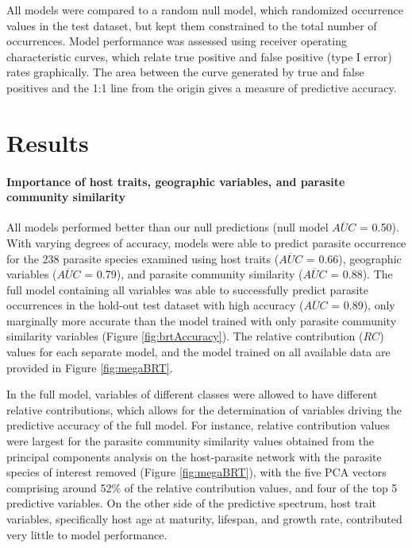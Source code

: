 \documentclass[12pt]{article}
\begin{document}
  All models were compared to a random null model, which randomized occurrence values in the test dataset, but kept them constrained to the total number of occurrences. Model performance was assessed using receiver operating characteristic curves, which relate true positive and false positive (type I error) rates graphically. The area between the curve generated by true and false positives and the 1:1 line from the origin gives a measure of predictive accuracy. 
  
   
\section*{Results}

  \paragraph{Importance of host traits, geographic variables, and parasite community similarity}
  All models performed better than our null predictions (null model $\overline{AUC}$ = 0.50). With varying degrees of accuracy, models were able to predict parasite occurrence for the 238 parasite species examined using host traits ($\overline{AUC}$ = 0.66), geographic variables ($\overline{AUC}$ = 0.79), and parasite community similarity ($\overline{AUC}$ = 0.88). The full model containing all variables was able to successfully predict parasite occurrences in the hold-out test dataset with high accuracy ($\overline{AUC}$ = 0.89), only marginally more accurate than the model trained with only parasite community similarity variables (Figure \ref{fig:brtAccuracy}). The relative contribution ($RC$) values for each separate model, and the model trained on all available data are provided in Figure \ref{fig:megaBRT}.  
  
  In the full model, variables of different classes were allowed to have different relative contributions, which allows for the determination of variables driving the predictive accuracy of the full model. For instance, relative contribution values were largest for the parasite community similarity values obtained from the principal components analysis on the host-parasite network with the parasite species of interest removed (Figure \ref{fig:megaBRT}), with the five PCA vectors comprising around 52\% of the relative contribution values, and four of the top 5 predictive variables. On the other side of the predictive spectrum, host trait variables, specifically host age at maturity, lifespan, and growth rate, contributed very little to model performance. 
    
\end{document}
